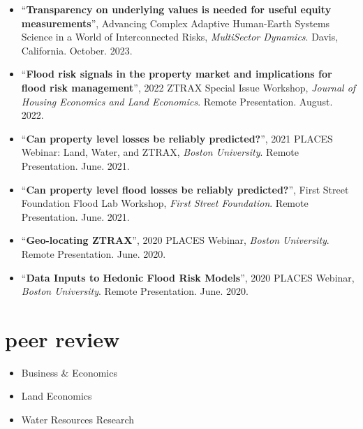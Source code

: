\documentclass[10pt,oneside]{article}
\begin{document}
\begin{itemize}[label={}]
  
  \item \enquote{\textbf{Transparency on underlying values is needed for useful equity measurements}}, Advancing Complex Adaptive Human-Earth Systems Science in a World of Interconnected Risks,  \textit{MultiSector Dynamics}. Davis, California.  October. 2023.
        
  \item \enquote{\textbf{Flood risk signals in the property market and implications for flood risk management}}, 2022 ZTRAX Special Issue Workshop,  \textit{Journal of Housing Economics and Land Economics}. Remote Presentation.  August. 2022.
        
  \item \enquote{\textbf{Can property level losses be reliably predicted?}}, 2021 PLACES Webinar: Land, Water, and ZTRAX,  \textit{Boston University}. Remote Presentation.  June. 2021.
        
  \item \enquote{\textbf{Can property level flood losses be reliably predicted?}}, First Street Foundation Flood Lab Workshop,  \textit{First Street Foundation}. Remote Presentation.  June. 2021.
        
  \item \enquote{\textbf{Geo-locating ZTRAX}}, 2020 PLACES Webinar,  \textit{Boston University}. Remote Presentation.  June. 2020.
        
  \item \enquote{\textbf{Data Inputs to Hedonic Flood Risk Models}}, 2020 PLACES Webinar,  \textit{Boston University}. Remote Presentation.  June. 2020.
        
\end{itemize}


\section{peer review}

\mbox{}\vspace{-\dimexpr\baselineskip\relax}

\begin{itemize}[label={}]
  
    \item Business \& Economics
  
    \item Land Economics
  
    \item Water Resources Research
  
\end{itemize}
\end{document}
